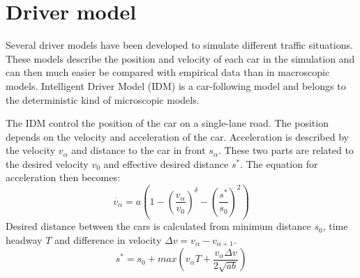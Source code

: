 \section{Driver model}
Several driver models have been developed to simulate different traffic situations. These models describe the position and velocity of each car in the simulation and can then much easier be compared with empirical data than in macroscopic models. Intelligent Driver Model (IDM) is a car-following model and belongs to the deterministic kind of microscopic models.

The IDM control the position of the car on a single-lane road. The position depends on the velocity and acceleration of the car. Acceleration is described by the velocity \begin{math}v_\alpha\end{math} and distance to the car in front \begin{math}s_\alpha\end{math}. These two parts are related to the desired velocity \begin{math}v_0\end{math} and effective desired distance \begin{math}s^\ast\end{math}. The equation for acceleration then becomes:
\begin{equation}\dot{v_\alpha} = a(1-(\frac{v_\alpha}{v_0})^\delta-(\frac{s^\ast}{s_0})^2)\end{equation}
Desired distance between the cars is calculated from minimum distance \begin{math}s_0\end{math}, time headway \begin{math}T\end{math} and difference in velocity \begin{math}\Delta v = v_\alpha - v_{\alpha + 1}\end{math}.
\begin{equation}\label{desireddist}s^\ast = s_0 + max(v_\alpha T + \frac{v_\alpha \Delta v}{2\sqrt{ab}})\end{equation}